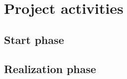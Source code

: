\documentclass{report}
\begin{document}
	
	
	\chapter{Project activities}
	
	
	\section{Start phase}
	
	\section{Realization phase}
	
	
\end{document}
